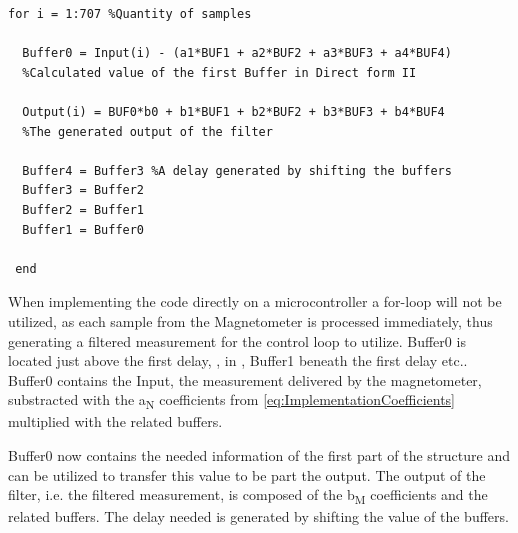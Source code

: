 \begin{lstlisting}
for i = 1:707 %Quantity of samples

  Buffer0 = Input(i) - (a1*BUF1 + a2*BUF2 + a3*BUF3 + a4*BUF4) 
  %Calculated value of the first Buffer in Direct form II
	
  Output(i) = BUF0*b0 + b1*BUF1 + b2*BUF2 + b3*BUF3 + b4*BUF4 
  %The generated output of the filter
    	
  Buffer4 = Buffer3	%A delay generated by shifting the buffers
  Buffer3 = Buffer2
  Buffer2 = Buffer1
  Buffer1 = Buffer0
    
 end
\end{lstlisting}

When implementing the code directly on a microcontroller a for-loop will not be utilized, as each sample from the Magnetometer is processed immediately, thus generating a filtered measurement for the control loop to utilize.
Buffer0 is located just above the first delay, \si{}, in , Buffer1 beneath the first delay etc.. Buffer0 contains the Input, the measurement delivered by the magnetometer, substracted with the \si{a_N} coefficients from \eqref{eq:ImplementationCoefficients} multiplied with the related buffers.

Buffer0 now contains the needed information of the first part of the structure and can be utilized to transfer this value to be part the output. The output of the filter, i.e. the filtered measurement, is composed of the \si{b_M} coefficients and the related buffers. The delay needed is generated by shifting the value of the buffers.

